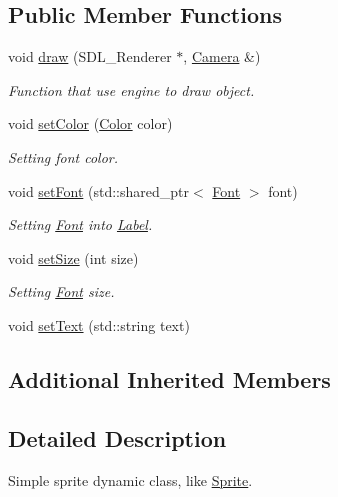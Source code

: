 \subsection*{Public Member Functions}
\begin{DoxyCompactItemize}
\item 
void \hyperlink{class_virtual_1_1_label_a077d7852f09f940a9932f63fb616351c}{draw} (S\+D\+L\+\_\+\+Renderer $\ast$, \hyperlink{class_virtual_1_1_camera}{Camera} \&)
\begin{DoxyCompactList}\small\item\em Function that use engine to draw object. \end{DoxyCompactList}\item 
void \hyperlink{class_virtual_1_1_label_adf4f738abab5dca3815a9c6f4124eec6}{set\+Color} (\hyperlink{struct_virtual_1_1_color}{Color} color)
\begin{DoxyCompactList}\small\item\em Setting font color. \end{DoxyCompactList}\item 
void \hyperlink{class_virtual_1_1_label_a643dca9416c60c78b1b1fc234ed6964c}{set\+Font} (std\+::shared\+\_\+ptr$<$ \hyperlink{class_virtual_1_1_font}{Font} $>$ font)
\begin{DoxyCompactList}\small\item\em Setting \hyperlink{class_virtual_1_1_font}{Font} into \hyperlink{class_virtual_1_1_label}{Label}. \end{DoxyCompactList}\item 
void \hyperlink{class_virtual_1_1_label_a20e22a03b54b9851ad675c491df1ae75}{set\+Size} (int size)
\begin{DoxyCompactList}\small\item\em Setting \hyperlink{class_virtual_1_1_font}{Font} size. \end{DoxyCompactList}\item 
void \hyperlink{class_virtual_1_1_label_a1b737a96ea06f214120c61dc2465536f}{set\+Text} (std\+::string text)
\end{DoxyCompactItemize}
\subsection*{Additional Inherited Members}


\subsection{Detailed Description}
Simple sprite dynamic class, like \hyperlink{class_virtual_1_1_sprite}{Sprite}. 

